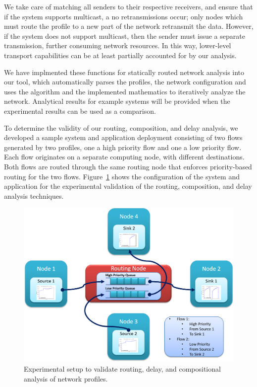 We take care of matching all senders to their respective receivers,
and ensure that if the system supports multicast, a no retransmissions
occur; only nodes which must route the profile to a new part of the
network retransmit the data.  However, if the system does not support
multicast, then the sender must issue a separate transmission, further
consuming network resources.  In this way, lower-level transport
capabilities can be at least partially accounted for by our analysis.

We have implmented these functions for statically routed network
analysis into our tool, which automatically parses the profiles, the
network configuration and uses the algorithm and the implemented
mathematics to iteratively analyze the network.  Analytical results
for example systems will be provided when the experimental results can
be used as a comparison.

To determine the validity of our routing, composition, and delay
analysis, we developed a sample system and application deployment
consisting of two flows generated by two profiles, one a high priority
flow and one a low priority flow.  Each flow originates on a separate
computing node, with different destinations.  Both flows are routed
through the same routing node that enforces priority-based routing for
the two flows.  Figure~\ref{fig:routing_example} shows the
configuration of the system and application for the experimental
validation of the routing, composition, and delay analysis techniques.

\begin{figure}[ht!]
  \centering
  \includegraphics[width=\textwidth]{../doc/src/images/results/routing_example.png}
  \caption{Experimental setup to validate routing, delay, and
    compositional analysis of network profiles.}
  \label{fig:routing_example}
\end{figure}

